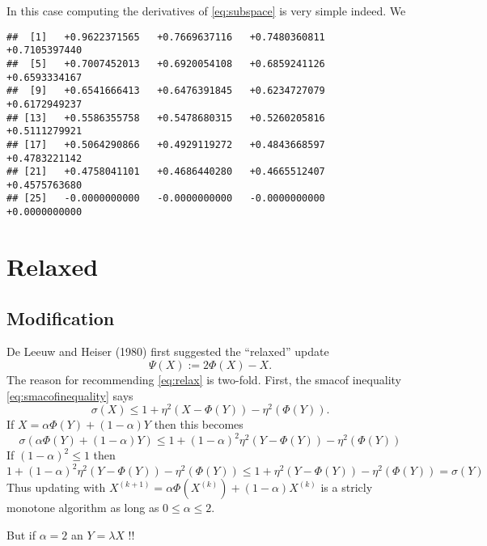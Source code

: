 \documentclass[
  12pt,
]{article}
\begin{document}
In this case computing the derivatives of \eqref{eq:subspace} is very simple indeed. We

\begin{verbatim}
##  [1]   +0.9622371565   +0.7669637116   +0.7480360811   +0.7105397440
##  [5]   +0.7007452013   +0.6920054108   +0.6859241126   +0.6593334167
##  [9]   +0.6541666413   +0.6476391845   +0.6234727079   +0.6172949237
## [13]   +0.5586355758   +0.5478680315   +0.5260205816   +0.5111279921
## [17]   +0.5064290866   +0.4929119272   +0.4843668597   +0.4783221142
## [21]   +0.4758041101   +0.4686440280   +0.4665512407   +0.4575763680
## [25]   -0.0000000000   -0.0000000000   -0.0000000000   +0.0000000000
\end{verbatim}

\section{Relaxed}\label{relaxed}

\subsection{Modification}\label{modification-3}

De Leeuw and Heiser (1980) first suggested the ``relaxed'' update
\begin{equation}
\Psi(X):=2\Phi(X)-X.
\label{eq:relax}
\end{equation}
The reason for recommending \eqref{eq:relax} is two-fold. First, the smacof inequality \eqref{eq:smacofinequality} says
\begin{equation}
\sigma(X)\leq 1+\eta^2(X-\Phi(Y))-\eta^2(\Phi(Y)).
\label{eq:smaineq}
\end{equation}
If \(X=\alpha\Phi(Y)+(1-\alpha)Y\) then this becomes
\begin{equation}
\sigma(\alpha\Phi(Y)+(1-\alpha)Y)\leq 1+(1-\alpha)^2\eta^2(Y-\Phi(Y))-\eta^2(\Phi(Y))
\end{equation}
If \((1-\alpha)^2\leq 1\) then
\begin{equation}
1+(1-\alpha)^2\eta^2(Y-\Phi(Y))-\eta^2(\Phi(Y))\leq 1+\eta^2(Y-\Phi(Y))-\eta^2(\Phi(Y))=\sigma(Y)
\end{equation}
Thus updating with \(X^{(k+1)}=\alpha\Phi(X^{(k)})+(1-\alpha)X^{(k)}\) is a stricly
monotone algorithm as long as \(0\leq\alpha\leq 2\).

But if \(\alpha=2\) an \(Y=\lambda X\) !!
\end{document}
